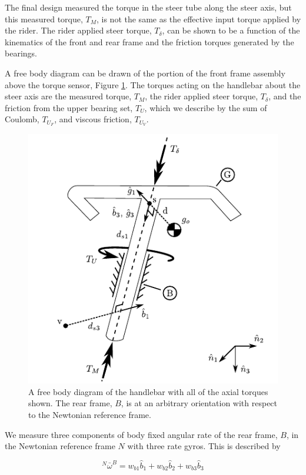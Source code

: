 \documentclass[a4paper]{article}
\begin{document}
The final design measured the torque in the steer tube along the steer axis,
but this measured torque, $T_M$, is not the same as the effective input torque
applied by the rider. The rider applied steer torque, $T_\delta$, can be shown
to be a function of the kinematics of the front and rear frame and the friction
torques generated by the bearings.

A free body diagram can be drawn of the portion of the front frame assembly
above the torque sensor, Figure \ref{fig:handlebar-free-body}. The torques
acting on the handlebar about the steer axis are the measured torque, $T_M$,
the rider applied steer torque, $T_\delta$, and the friction from the upper
bearing set, $T_U$, which we describe by the sum of Coulomb, $T_{U_F}$, and
viscous friction, $T_{U_V}$.

\begin{figure}
  \centering
  \includegraphics{figures/handlebar-free-body.pdf}
  \caption{A free body diagram of the handlebar with all of the axial torques
    shown. The rear frame, $B$, is at an arbitrary orientation with respect to
    the Newtonian reference frame.}
  \label{fig:handlebar-free-body}
\end{figure}

We measure three components of body fixed angular rate of the rear frame, $B$,
in the Newtonian reference frame $N$ with three rate gyros. This is described
by

\begin{equation} ^N\bar{\omega}^B = w_{b1}\hat{b}_1 + w_{b2}\hat{b}_2 +
  w_{b3}\hat{b}_3
  \label{eq:rear-frame-angular-rate}
\end{equation}
\end{document}
